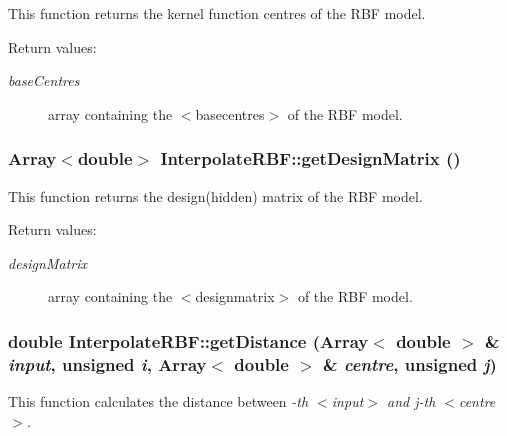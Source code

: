 This function returns the kernel function centres of the RBF model. 

\begin{Desc}
\item[Return values:]
\begin{description}
\item[{\em base\-Centres}]array containing the $<$basecentres$>$ of the RBF model.\end{description}
\end{Desc}
\subsubsection{\setlength{\rightskip}{0pt plus 5cm}Array$<$double$>$ Interpolate\-RBF::get\-Design\-Matrix ()}\label{classInterpolateRBF_a11}


This function returns the design(hidden) matrix of the RBF model. 

\begin{Desc}
\item[Return values:]
\begin{description}
\item[{\em design\-Matrix}]array containing the $<$designmatrix$>$ of the RBF model.\end{description}
\end{Desc}
\subsubsection{\setlength{\rightskip}{0pt plus 5cm}double Interpolate\-RBF::get\-Distance (Array$<$ double $>$ \& {\em input}, unsigned {\em i}, Array$<$ double $>$ \& {\em centre}, unsigned {\em j})\hspace{0.3cm}{\tt  [static]}}\label{classInterpolateRBF_e0}


This function calculates the distance between {\em -th $<$input$>$ and j-th $<$centre$>$. \/}

